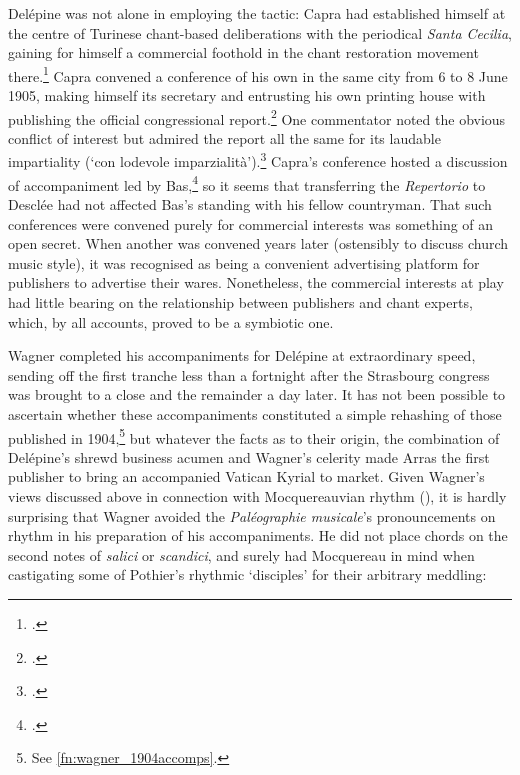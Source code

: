 Delépine was not alone in employing the tactic: Capra had established himself at the centre of Turinese chant-based deliberations with the periodical \emph{Santa Cecilia}, gaining for himself a commercial foothold in the chant restoration movement there.\footcite[22--5]{Carolimusicasacraperiodici2017}
Capra convened a conference of his own in the same city from 6 to 8 June 1905, making himself its secretary and entrusting his own printing house with publishing the official congressional report.\footnote{\covid{}\cite{AttiVIIcongresso1905}.}
One commentator noted the obvious conflict of interest but admired the report all the same for its laudable impartiality (`con lodevole imparzialità').\footcite[852]{ReviewCapraAtti1905}
Capra's conference hosted a discussion of accompaniment led by Bas,\footcite[47]{ReviewCapraAtti1905a} so it seems that transferring the \emph{Repertorio} to Desclée had not affected Bas's standing with his fellow countryman.
That such conferences were convened purely for commercial interests was something of an open secret.
When another was convened years later (ostensibly to discuss church music style), it was recognised as being a convenient advertising platform for publishers to advertise their wares.
Nonetheless, the commercial interests at play had little bearing on the relationship between publishers and chant experts, which, by all accounts, proved to be a symbiotic one.
\nowidow[2]

Wagner completed his accompaniments for Delépine at extraordinary speed, sending off the first tranche less than a fortnight after the Strasbourg congress was brought to a close and the remainder a day later.
It has not been possible to ascertain whether these accompaniments constituted a simple rehashing of those published in 1904,\footnote{See \cref{fn:wagner_1904accomps}.} but whatever the facts as to their origin, the combination of Delépine's shrewd business acumen and Wagner's celerity made Arras the first publisher to bring an accompanied Vatican Kyrial to market.
Given Wagner's views discussed above in connection with Mocquereauvian rhythm (), it is hardly surprising that Wagner avoided the \emph{Paléographie musicale}'s pronouncements on rhythm in his preparation of his accompaniments.
He did not place chords on the second notes of \emph{salici} or \emph{scandici}, and surely had Mocquereau in mind when castigating some of Pothier's rhythmic `disciples' for their arbitrary meddling:

